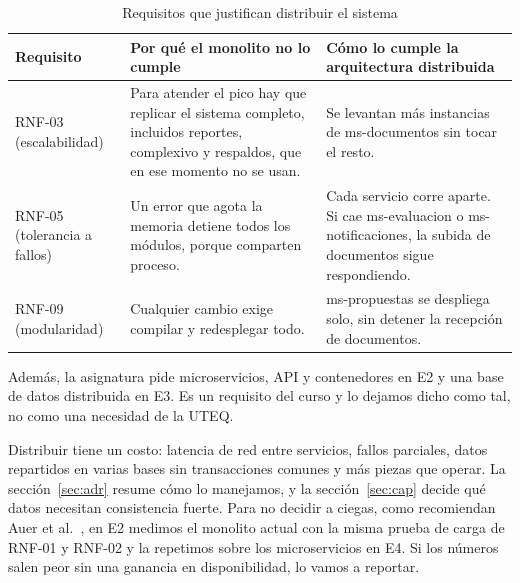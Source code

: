 \begin{table}[ht]
\centering
\small
\caption{Requisitos que justifican distribuir el sistema}\label{tab:justificacion}
\begin{tabularx}{\textwidth}{@{}L{2.9cm}YY@{}}
\toprule
Requisito & Por qué el monolito no lo cumple & Cómo lo cumple la arquitectura distribuida \\
\midrule
RNF-03 (escalabilidad) & Para atender el pico hay que replicar el sistema completo, incluidos reportes, complexivo y respaldos, que en ese momento no se usan. & Se levantan más instancias de ms-documentos sin tocar el resto. \\
RNF-05 (tolerancia a fallos) & Un error que agota la memoria detiene todos los módulos, porque comparten proceso. & Cada servicio corre aparte. Si cae ms-evaluacion o ms-notificaciones, la subida de documentos sigue respondiendo. \\
RNF-09 (modularidad) & Cualquier cambio exige compilar y redesplegar todo. & ms-propuestas se despliega solo, sin detener la recepción de documentos. \\
\bottomrule
\end{tabularx}
\end{table}

Además, la asignatura pide microservicios, API y contenedores en E2 y una base de datos distribuida en E3. Es un requisito del curso y lo dejamos dicho como tal, no como una necesidad de la UTEQ.

Distribuir tiene un costo: latencia de red entre servicios, fallos parciales, datos repartidos en varias bases sin transacciones comunes y más piezas que operar. La sección~\ref{sec:adr} resume cómo lo manejamos, y la sección~\ref{sec:cap} decide qué datos necesitan consistencia fuerte. Para no decidir a ciegas, como recomiendan Auer et al.~\cite{auer2021monolithic}, en E2 medimos el monolito actual con la misma prueba de carga de RNF-01 y RNF-02 y la repetimos sobre los microservicios en E4. Si los números salen peor sin una ganancia en disponibilidad, lo vamos a reportar.
